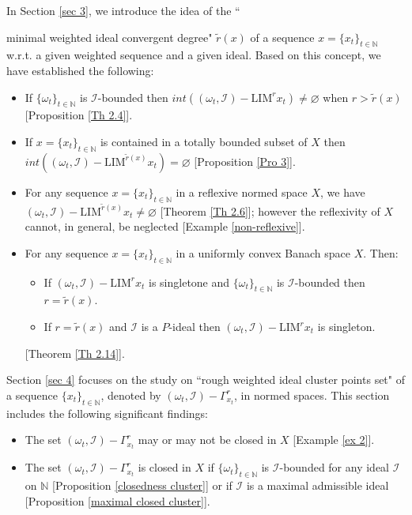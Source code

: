 \documentclass[reqno]{amsart}
\begin{document}
In Section \ref{sec 3}, we introduce the idea of the ``{minimal weighted ideal convergent degree" $\tilde{r}(x)$ of a sequence $x=\{x_t\}_{t\in\mathbb{N}}$ w.r.t. a given weighted sequence and a given ideal. Based on this concept, we have established the following:
\begin{itemize}
	\item If $\{\omega_t\}_{t\in\mathbb{N}}$ is $\mathcal{I}$-bounded then $int((\omega_t,\mathcal{I})-\text{LIM}^{r} x_t)\neq \varnothing$ when $r>\tilde{r}(x)$ [Proposition \ref{Th 2.4}]. 
	\item 
	If  $x=\{x_t\}_{t\in\mathbb{N}}$ is contained in a totally bounded subset of $X$ then $int((\omega_t,\mathcal{I})-\text{LIM}^{\tilde{r}(x)} x_t)=\varnothing$ [Proposition \ref{Pro 3}].
	\item For any sequence $x=\{x_t\}_{t\in\mathbb{N}}$ in a reflexive normed space $X$, we have $(\omega_t,\mathcal{I})-\text{LIM}^{\tilde{r}(x)} x_t\neq\varnothing$ [Theorem \ref{Th 2.6}]; however the reflexivity of $X$ cannot, in general, be neglected [Example \ref{non-reflexive}].
	\item 
	For any sequence $x=\{x_t\}_{t\in\mathbb{N}}$  in a uniformly convex Banach space $X$.
Then:
	\begin{itemize}
		\item[(i)] If $(\omega_t,\mathcal{I})-\text{LIM}^{r} x_t$ is singletone and $\{\omega_t\}_{t\in\mathbb{N}}$ is $\mathcal{I}$-bounded  then $r=\tilde{r}(x)$.
		\item [(ii)] If $r=\tilde{r}(x)$ and $\mathcal{I}$ is a $P$-ideal then $(\omega_t,\mathcal{I})-\text{LIM}^{r} x_t$ is singleton.
	\end{itemize}
[Theorem \ref{Th 2.14}].
\end{itemize} 
Section \ref{sec 4} focuses on the study on ``rough weighted ideal cluster points set" of a sequence $\{x_t\}_{t\in\mathbb{N}}$, denoted by $(\omega_t,\mathcal{I})-\Gamma_{x_t}^r$, in normed spaces. This section includes the following significant findings: 
\begin{itemize}
\item The set $(\omega_t,\mathcal{I})-\Gamma_{x_t}^r$ may or may not be closed in $X$ [Example \ref{ex 2}].
\item The set $(\omega_t,\mathcal{I})-\Gamma_{x_t}^r$ is closed in $X$ if  $\{\omega_t\}_{t\in\mathbb{N}}$ is $\mathcal{I}$-bounded for any ideal $\mathcal{I}$ on $\mathbb{N}$ [Proposition \ref{closedness cluster}] or if $\mathcal{I}$ is a maximal admissible ideal [Proposition \ref{maximal closed cluster}].

\end{itemize}}
\end{document}
